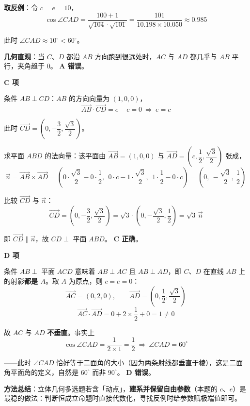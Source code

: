 \textbf{取反例}：令 $c=e=10$，
\[\cos\angle CAD=\frac{100+1}{\sqrt{104}\cdot\sqrt{101}}=\frac{101}{10.198\times10.050}\approx 0.985\]

此时 $\angle CAD\approx 10^\circ<60^\circ$。

\textbf{几何直观}：当 $C$、$D$ 都沿 $AB$ 方向跑到很远处时，$AC$ 与 $AD$ 都几乎与 $AB$ 平行，夹角趋于 $0$。 \textbf{A 错误}。

\par\medskip

\textbf{C 项}

条件 $AB\perp CD$：$AB$ 的方向向量为 $(1,0,0)$，
\[\overrightarrow{AB}\cdot\overrightarrow{CD}=e-c=0\ \Longrightarrow\ e=c\]

此时 $\overrightarrow{CD}=\left(0,-\dfrac32,\dfrac{\sqrt3}{2}\right)$。

求平面 $ABD$ 的法向量：该平面由 $\overrightarrow{AB}=(1,0,0)$ 与 $\overrightarrow{AD}=\left(c,\dfrac12,\dfrac{\sqrt3}{2}\right)$ 张成，
\[\vec n=\overrightarrow{AB}\times\overrightarrow{AD}=\left(0\cdot\frac{\sqrt3}{2}-0\cdot\frac12,\ \ 0\cdot c-1\cdot\frac{\sqrt3}{2},\ \ 1\cdot\frac12-0\cdot c\right)=\left(0,\ -\frac{\sqrt3}{2},\ \frac12\right)\]

比较 $\overrightarrow{CD}$ 与 $\vec n$：
\[\overrightarrow{CD}=\left(0,-\frac32,\frac{\sqrt3}{2}\right)=\sqrt3\cdot\left(0,-\frac{\sqrt3}{2},\frac12\right)=\sqrt3\,\vec n\]

即 $\overrightarrow{CD}\parallel\vec n$，故 $CD\perp$ 平面 $ABD$。 \textbf{C 正确}。

\par\medskip

\textbf{D 项}

条件 $AB\perp$ 平面 $ACD$ 意味着 $AB\perp AC$ 且 $AB\perp AD$，即 $C$、$D$ 在直线 $AB$ 上的射影\textbf{都是 $A$}。取 $A$ 为原点，则 $c=e=0$：
\[\overrightarrow{AC}=(0,2,0),\qquad \overrightarrow{AD}=\left(0,\frac12,\frac{\sqrt3}{2}\right)\]
\[\overrightarrow{AC}\cdot\overrightarrow{AD}=0+2\times\frac12+0=1\ne 0\]

故 $AC$ 与 $AD$ \textbf{不垂直}。事实上
\[\cos\angle CAD=\frac{1}{2\times1}=\frac12\ \Longrightarrow\ \angle CAD=60^\circ\]

——此时 $\angle CAD$ 恰好等于二面角的大小（因为两条射线都垂直于棱），这是二面角平面角的定义，自然是 $60^\circ$ 而非 $90^\circ$。 \textbf{D 错误}。


\begin{gktip}
\textbf{方法总结}：立体几何多选题若含「动点」，\textbf{建系并保留自由参数}（本题的 $c$、$e$）是最稳的做法：判断恒成立命题时直接代数化，寻找反例时给参数赋极端值即可。
\end{gktip}

